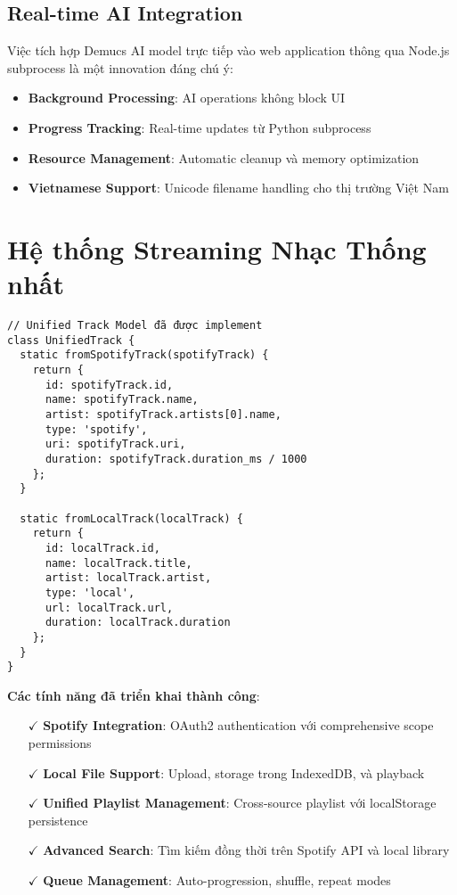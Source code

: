 \documentclass[12pt,a4paper]{article}
\begin{document}
\subsection{Real-time AI Integration}

Việc tích hợp Demucs AI model trực tiếp vào web application thông qua Node.js subprocess là một innovation đáng chú ý:

\begin{itemize}
\item \textbf{Background Processing}: AI operations không block UI
\item \textbf{Progress Tracking}: Real-time updates từ Python subprocess
\item \textbf{Resource Management}: Automatic cleanup và memory optimization
\item \textbf{Vietnamese Support}: Unicode filename handling cho thị trường Việt Nam
\end{itemize}

\section{Hệ thống Streaming Nhạc Thống nhất}

\begin{lstlisting}[caption={Unified Track Model implementation}]
// Unified Track Model đã được implement
class UnifiedTrack {
  static fromSpotifyTrack(spotifyTrack) {
    return {
      id: spotifyTrack.id,
      name: spotifyTrack.name,
      artist: spotifyTrack.artists[0].name,
      type: 'spotify',
      uri: spotifyTrack.uri,
      duration: spotifyTrack.duration_ms / 1000
    };
  }
  
  static fromLocalTrack(localTrack) {
    return {
      id: localTrack.id,
      name: localTrack.title,
      artist: localTrack.artist,
      type: 'local',
      url: localTrack.url,
      duration: localTrack.duration
    };
  }
}
\end{lstlisting}

\textbf{Các tính năng đã triển khai thành công}:
\begin{itemize}
\item[$\checkmark$] \textbf{Spotify Integration}: OAuth2 authentication với comprehensive scope permissions
\item[$\checkmark$] \textbf{Local File Support}: Upload, storage trong IndexedDB, và playback
\item[$\checkmark$] \textbf{Unified Playlist Management}: Cross-source playlist với localStorage persistence
\item[$\checkmark$] \textbf{Advanced Search}: Tìm kiếm đồng thời trên Spotify API và local library
\item[$\checkmark$] \textbf{Queue Management}: Auto-progression, shuffle, repeat modes
\end{itemize}
\end{document}
